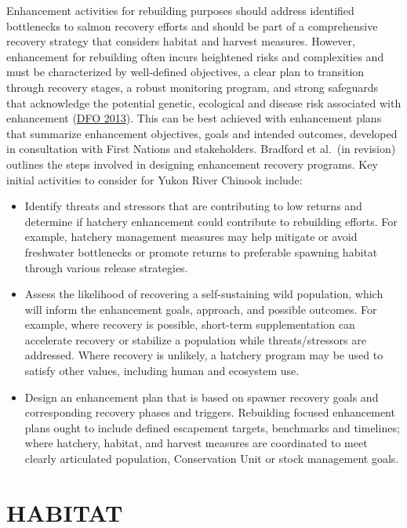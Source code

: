 \documentclass[11pt]{book}
\begin{document}
Enhancement activities for rebuilding purposes should address identified bottlenecks to salmon recovery efforts and should be part of a comprehensive recovery strategy that considers habitat and harvest measures. However, enhancement for rebuilding often incurs heightened risks and complexities and must be characterized by well-defined objectives, a clear plan to transition through recovery stages, a robust monitoring program, and strong safeguards that acknowledge the potential genetic, ecological and disease risk associated with enhancement (\protect\hyperlink{ref-DFO2013}{DFO 2013}). This can be best achieved with enhancement plans that summarize enhancement objectives, goals and intended outcomes, developed in consultation with First Nations and stakeholders. Bradford et al.~(in revision) outlines the steps involved in designing enhancement recovery programs. Key initial activities to consider for Yukon River Chinook include:
\begin{itemize}
\item
  Identify threats and stressors that are contributing to low returns and determine if hatchery enhancement could contribute to rebuilding efforts. For example, hatchery management measures may help mitigate or avoid freshwater bottlenecks or promote returns to preferable spawning habitat through various release strategies.
\item
  Assess the likelihood of recovering a self-sustaining wild population, which will inform the enhancement goals, approach, and possible outcomes. For example, where recovery is possible, short-term supplementation can accelerate recovery or stabilize a population while threats/stressors are addressed. Where recovery is unlikely, a hatchery program may be used to satisfy other values, including human and ecosystem use.
\item
  Design an enhancement plan that is based on spawner recovery goals and corresponding recovery phases and triggers. Rebuilding focused enhancement plans ought to include defined escapement targets, benchmarks and timelines; where hatchery, habitat, and harvest measures are coordinated to meet clearly articulated population, Conservation Unit or stock management goals.
\end{itemize}
\hypertarget{sec:HABITAT}{%
\section{HABITAT}\label{sec:HABITAT}}
\end{document}
